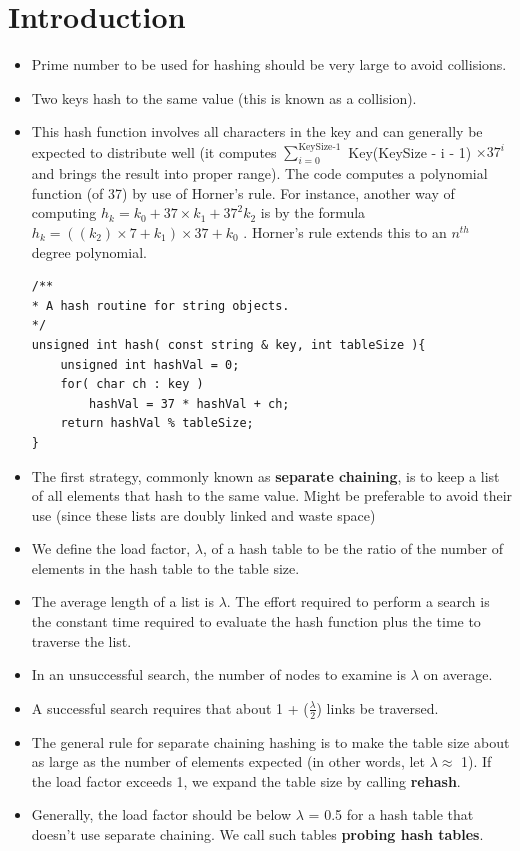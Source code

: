 \documentclass[a4paper,oneside]{book}
\begin{document}
\section{Introduction}
\begin{itemize}
\item Prime number to be used for hashing should be very large to avoid collisions.
\item Two keys hash to the same value (this is known as a collision).
\item This hash function involves all characters in the key and can generally be
expected to distribute well (it computes
$\sum_{i=0}^{\text{KeySize-1}}$ Key(KeySize - i - 1) $\times 37^{i}$ and
brings the result into proper range). The code computes a polynomial function (of 37) by use of Horner's rule. For instance, another way
of computing $h_k = k_0 + 37\times k_1 + 37^2 k_2$ is by the formula $h_k =
((k_2)\times7 + k_1 )\times37 + k_0$ .
Horner’s rule extends this to an $n^{th}$ degree polynomial.
\begin{verbatim}
/**
* A hash routine for string objects.
*/
unsigned int hash( const string & key, int tableSize ){
	unsigned int hashVal = 0;
	for( char ch : key )
		hashVal = 37 * hashVal + ch;
	return hashVal % tableSize;
}
\end{verbatim}
\item The first strategy, commonly known as \textbf{separate chaining}, is to keep a list of all elements
that hash to the same value. Might be preferable to avoid their use (since these lists are doubly linked and
waste space)
\item We define the load factor, $\lambda$, of a hash table to be the ratio of the number of elements
in the hash table to the table size. 
\item The average length of a
list is $\lambda$. The effort required to perform a search is the constant time
required to evaluate the hash function plus the time to traverse the list. 
\item In an unsuccessful search, the number of nodes to examine is $\lambda$ on average. 
\item A successful search requires that about 1 + ($\frac{\lambda}{2}$) links be traversed.
\item The general rule
for separate chaining hashing is to make the table size about as large as the number of
elements expected (in other words, let $\lambda \approx$ 1). If the load
factor exceeds 1, we expand the table size by calling \textbf{rehash}.
\item Generally, the load factor should be below $\lambda$ = 0.5 for a hash table that doesn’t use separate chaining. We call such tables \textbf{probing hash tables}.

\end{itemize}
\end{document}
